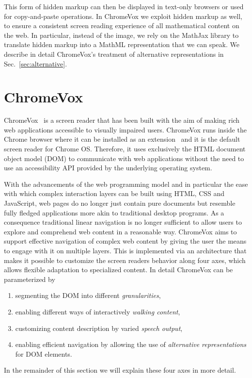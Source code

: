 \documentclass{sig-alternate}
\begin{document}
This form of hidden markup can then be displayed in text-only browsers or used
for copy-and-paste operations.  In ChromeVox we exploit hidden markup as well,
to ensure a consistent screen reading experience of all mathematical content on
the web.  In particular, instead of the image, we rely on the MathJax library to
translate hidden markup into a MathML representation that we can speak. We
describe in detail ChromeVox's treatment of alternative representations in
Sec.~\ref{sec:alternative}.



\section{ChromeVox}
\label{sec:chromevox}

ChromeVox~\cite{google:chromevox-tutorial} is a screen reader that has been
built with the aim of making rich web applications accessible to visually
impaired users. ChromeVox runs inside the Chrome browser where it can be
installed as an extension~\cite{google:chromevox-webstore} and it is the default
screen reader for Chrome OS. Therefore, it uses exclusively the HTML document
object model (DOM) to communicate with web applications without the need to use
an accessibility API provided by the underlying operating system.

With the advancements of the web programming model and in particular the ease
with which complex interaction layers can be built using HTML, CSS and
JavaScript, web pages do no longer just contain pure documents but resemble
fully fledged applications more akin to traditional desktop programs. As a
consequence traditional linear navigation is no longer sufficient to allow users
to explore and comprehend web content in a reasonable way.  ChromeVox aims to
support effective navigation of complex web content by giving the user the means
to engage with it on multiple layers. This is implemented via an architecture
that makes it possible to customize the screen readers behavior along four axes,
which allows flexible adaptation to specialized content. In detail ChromeVox can
be parameterized by
\begin{enumerate}[(1)]
\item segmenting the DOM into different \emph{granularities},
\item enabling different ways of interactively \emph{walking content},
\item customizing content description by varied \emph{speech output},
\item enabling efficient navigation by allowing the use of \emph{alternative
    representations} for DOM elements.
\end{enumerate}
In the remainder of this section we will explain these four axes in more detail.
\end{document}
